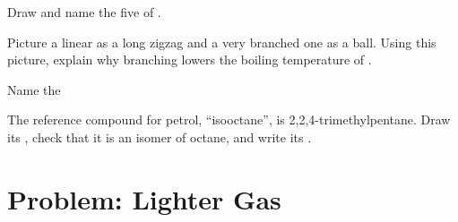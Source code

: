 \begin{exercise}[$\star\star\star$]\label{exo:g11:organic-skeletons:12}
Draw and name the five  of .
\end{exercise}

\begin{exercise}[$\star\star\star$]\label{exo:g11:organic-skeletons:13}
Picture a linear  as a long zigzag and a very branched one as a
ball. Using this picture, explain why branching lowers the boiling
temperature of .
\end{exercise}

\begin{exercise}[$\star\star\star$]\label{exo:g11:organic-skeletons:14}
Name the 
\begin{center}
\end{center}
\end{exercise}

\begin{exercise}[$\star\star\star$]\label{exo:g11:organic-skeletons:15}
The reference compound for petrol, ``isooctane'', is
2,2,4-trimethylpentane. Draw its , check that it is an
isomer of octane, and write its .
\end{exercise}

\section{Problem: Lighter Gas}

